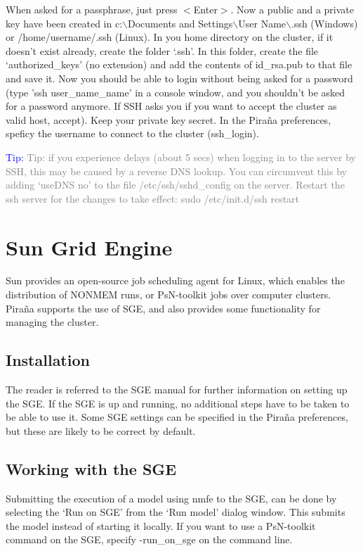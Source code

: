 \documentclass[a4,11pt]{report} \usepackage[pdftex]{graphicx}
\begin{document}
{{\noindent When asked for a passphrase, just press $<$Enter$>$.  Now a
public and a private key have been created in c:$\backslash$Documents
and Settings$\backslash$User Name$\backslash$.ssh
(Windows) or /home/username/.ssh (Linux).  In you home directory on
the cluster, if it doesn't exist already, create the folder `.ssh'. In
this folder, create the file `authorized\_keys' (no extension) and add
the contents of id\_rsa.pub to that file and save it. Now you should
be able to login without being asked for a password (type 'ssh
user\_name\@cluster\_name' in a console window, and you shouldn't be
asked for a password anymore. If SSH asks you if you want to accept
the cluster as valid host, accept). Keep your private key secret. In
the Pira\~na preferences, speficy the username to connect to the cluster
(ssh\_login).

\vspace{10pt}
\noindent\scriptsize{\textcolor{Blue}{Tip:} \textcolor{Grey} {Tip: if you experience delays (about 5 secs) when logging in to the
server by SSH, this may be caused by a reverse DNS lookup. You can
circumvent this by adding `useDNS no' to the file /etc/ssh/sshd\_config
on the server. Restart the ssh server for the changes to take effect:
sudo /etc/init.d/ssh restart}
\normalsize


\section{Sun Grid Engine}

Sun provides an open-source job scheduling agent for Linux, which
enables the distribution of NONMEM runs, or PsN-toolkit jobs over
computer clusters. Pira\~na supports the use of SGE, and also provides
some functionality for managing the cluster.

\subsection{Installation}
The reader is referred to the SGE manual for further information on
setting up the SGE. If the SGE is up and running, no additional steps
have to be taken to be able to use it. Some SGE settings can be
specified in the Pira\~na preferences, but these are likely to be
correct by default.

\subsection{Working with the SGE}
Submitting the execution of a model using nmfe to the SGE, can be done
by selecting the `Run on SGE' from the `Run model' dialog window. This
submits the model instead of starting it locally. If you want to use a
PsN-toolkit command on the SGE, specify -run\_on\_sge on the command
line.

}}}
\end{document}
